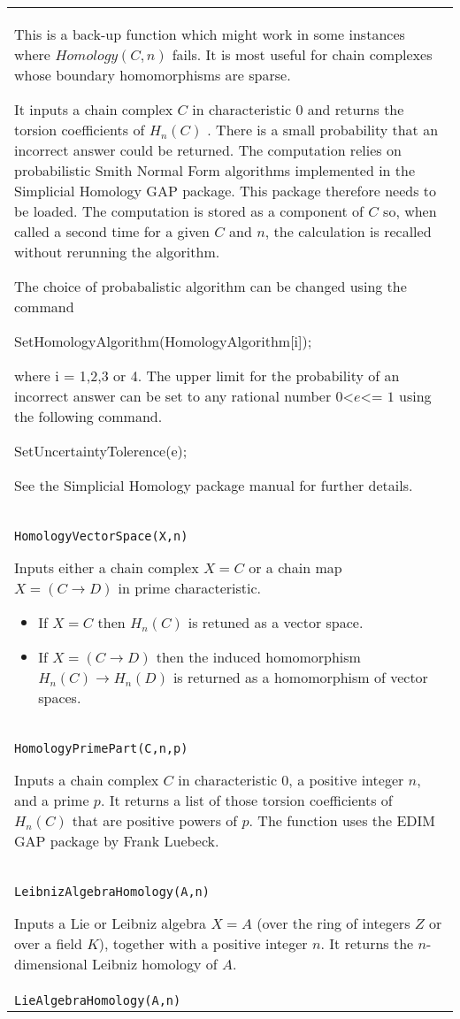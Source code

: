 \documentclass[a4paper,11pt]{report}
\begin{document}
{\begin{center}
\begin{tabular}{|l|}
 This is a back-up function which might work in some instances where $Homology(C,n)$ fails. It is most useful for chain complexes whose boundary homomorphisms are
sparse. 

 It inputs a chain complex $C$ in characteristic $0$ and returns the torsion coefficients of $H_n(C)$ . There is a small probability that an incorrect answer could be returned. The
computation relies on probabilistic Smith Normal Form algorithms implemented
in the Simplicial Homology GAP package. This package therefore needs to be
loaded. The computation is stored as a component of $C$ so, when called a second time for a given $C$ and $n$, the calculation is recalled without rerunning the algorithm. 

 The choice of probabalistic algorithm can be changed using the command 

 SetHomologyAlgorithm(HomologyAlgorithm[i]);

 where i = 1,2,3 or 4. The upper limit for the probability of an incorrect
answer can be set to any rational number $0${\textless}$e${\textless}= $1$ using the following command. 

SetUncertaintyTolerence(e);

 See the Simplicial Homology package manual for further details. \\
 \index{HomologyVectorSpace} \texttt{HomologyVectorSpace(X,n)} 

 Inputs either a chain complex $X=C$ or a chain map $X=(C \longrightarrow D)$ in prime characteristic. 
\begin{itemize}
\item If $X=C$ then $H_n(C)$ is retuned as a vector space.
\item  If $X=(C \longrightarrow D)$ then the induced homomorphism $H_n(C) \longrightarrow H_n(D)$ is returned as a homomorphism of vector spaces. 
\end{itemize}
 \\
 \index{HomologyPrimePart} \texttt{HomologyPrimePart(C,n,p)} 

 Inputs a chain complex $C$ in characteristic 0, a positive integer $n$, and a prime $p$. It returns a list of those torsion coefficients of $H_n(C)$ that are positive powers of $p$. The function uses the EDIM GAP package by Frank Luebeck. \\
 \index{LeibnizAlgebraHomology} \texttt{LeibnizAlgebraHomology(A,n)} 

 Inputs a Lie or Leibniz algebra $X=A$ (over the ring of integers $Z$ or over a field $K$), together with a positive integer $n$. It returns the $n$-dimensional Leibniz homology of $A$. \\
 \index{LieAlgebraHomology} \texttt{LieAlgebraHomology(A,n)} 


\end{tabular}
\end{center}}
\end{document}
